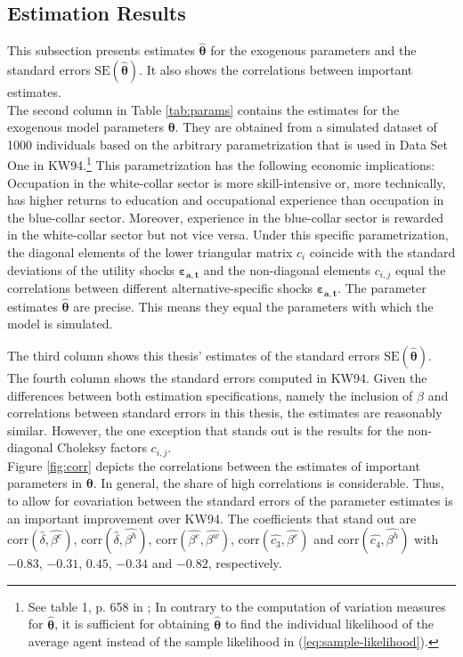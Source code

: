 \subsection{Estimation Results}
This subsection presents estimates $\pmb{\hat{\theta}}$ for the exogenous parameters and the standard errors $\text{SE}(\pmb{\hat{\theta}})$. It also shows the correlations between important estimates.\\
\newline
The second column in Table \ref{tab:params} contains the estimates for the exogenous model parameters $\pmb{\theta}$. They are obtained from a simulated dataset of 1000 individuals based on the arbitrary parametrization that is used in Data Set One in KW94.\footnote{See table 1, p. 658 in \cite{Keane.1994}; In contrary to the computation of variation measures for $\pmb{\hat{\theta}}$, it is sufficient for obtaining $\pmb{\hat{\theta}}$ to find the individual likelihood of the average agent instead of the sample likelihood in (\ref{eq:sample-likelihood}).}
This parametrization has the following economic implications: Occupation in the white-collar sector is more skill-intensive or, more technically, has higher returns to education and occupational experience than occupation in the blue-collar sector. Moreover, experience in the blue-collar sector is rewarded in the white-collar sector but not vice versa.
Under this specific parametrization, the diagonal elements of the lower triangular matrix $c_{i}$ coincide with the standard deviations of the utility shocks $\pmb{\varepsilon_{a,t}}$ and the non-diagonal elements $c_{i,j}$ equal the correlations between different alternative-specific shocks $\pmb{\varepsilon_{a,t}}$.
The parameter estimates $\pmb{\hat{\theta}}$ are precise. This means they equal the parameters with which the model is simulated.

The third column shows this thesis' estimates of the standard errors $\text{SE}(\pmb{\hat{\theta}})$. The fourth column shows the standard errors computed in KW94. Given the differences between both estimation specifications, namely the inclusion of $\beta$ and correlations between standard errors in this thesis, the estimates are reasonably similar. However, the one exception that stands out is the results for the non-diagonal Choleksy factors $c_{i,j}$.\\

\noindent
Figure \ref{fig:corr} depicts the correlations between the estimates of important parameters in $\pmb{\theta}$. In general, the share of high correlations is considerable. Thus, to allow for covariation between the standard errors of the parameter estimates is an important improvement over KW94. The coefficients that stand out are $\text{corr}(\hat{\delta},\hat{\beta^e})$, $\text{corr}(\hat{\delta},\hat{\beta^h})$, $\text{corr}(\hat{\beta^e},\hat{\beta^w})$, $\text{corr}(\hat{c_3},\hat{\beta^e})$ and $\text{corr}(\hat{c_4},\hat{\beta^h})$ with $-0.83$, $-0.31$, $0.45$, $-0.34$ and $-0.82$, respectively.\\

